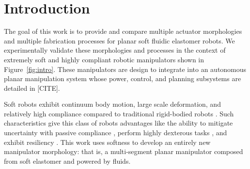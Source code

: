 
\section{Introduction}
\label{sec:Introduction}
The goal of this work is to provide and compare multiple actuator morphologies and multiple fabrication processes for planar soft fluidic elastomer robots.
%
We experimentally validate these morphologies and processes in the context of extremely soft and highly compliant robotic manipulators shown in Figure~\ref{fig:intro}.
%
These manipulators are design to integrate into an autonomous planar manipulation system whose power, control, and planning subsystems are detailed in [CITE].

Soft robots exhibit continuum body motion, large scale deformation, and relatively high compliance compared to traditional rigid-bodied robots \citep{trivedi2008soft}.
%
Such characteristics give this class of robots advantages like the ability to mitigate uncertainty with passive compliance \citep{mcmahan2006field}, perform highly dexterous tasks \citep{deimel2014novel}, and exhibit resiliency \citep{tolley2014resilient}.
%
This work uses softness to develop an entirely new manipulator morphology: that is, a multi-segment planar manipulator composed from soft elastomer and powered by fluids.

